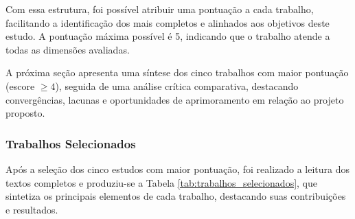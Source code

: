 Com essa estrutura, foi possível atribuir uma pontuação a cada trabalho, facilitando a identificação dos mais completos e alinhados aos objetivos deste estudo. A pontuação máxima possível é 5, indicando que o trabalho atende a todas as dimensões avaliadas.

A próxima seção apresenta uma síntese dos cinco trabalhos com maior pontuação (escore $\geq 4$), seguida de uma análise crítica comparativa, destacando convergências, lacunas e oportunidades de aprimoramento em relação ao projeto proposto.

\subsubsection{Trabalhos Selecionados}

Após a seleção dos cinco estudos com maior pontuação, foi realizado a leitura dos textos completos e produziu-se a Tabela \ref{tab:trabalhos_selecionados}, que sintetiza os principais elementos de cada trabalho, destacando suas contribuições e resultados.

